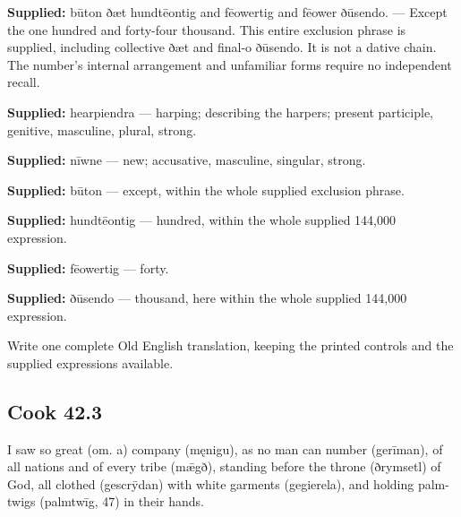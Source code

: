 \textbf{Supplied:} būton ðæt hundtēontig and fēowertig and fēower ðūsendo. — Except the one hundred and forty-four thousand. This entire exclusion phrase is supplied, including collective ðæt and final-o ðūsendo. It is not a dative chain. The number’s internal arrangement and unfamiliar forms require no independent recall.

\textbf{Supplied:} hearpiendra — harping; describing the harpers; present participle, genitive, masculine, plural, strong.

\textbf{Supplied:} nīwne — new; accusative, masculine, singular, strong.

\textbf{Supplied:} būton — except, within the whole supplied exclusion phrase.

\textbf{Supplied:} hundtēontig — hundred, within the whole supplied 144,000 expression.

\textbf{Supplied:} fēowertig — forty.

\textbf{Supplied:} ðūsendo — thousand, here within the whole supplied 144,000 expression.

Write one complete Old English translation, keeping the printed controls and the supplied expressions available.

\par\begin{minipage}{\linewidth}\raggedright
\subsection*{Cook 42.3}

I saw so great (om. a) company (męnigu), as no man can number (gerīman), of all nations and of every tribe (mǣgð), standing before the throne (ðrymsetl) of God, all clothed (gescrȳdan) with white garments (gegierela), and holding palm-twigs (palmtwīg, 47) in their hands.

\end{minipage}\par\addvspace{4pt}


